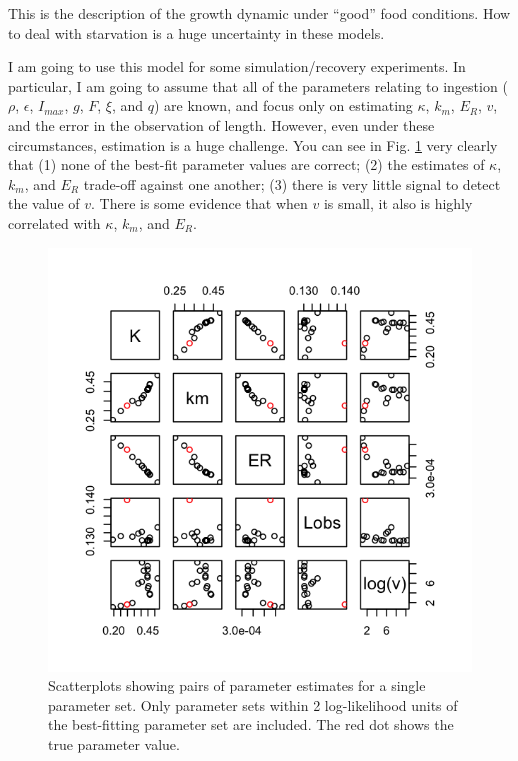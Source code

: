\documentclass[12pt,reqno,final,pdftex]{amsart}\usepackage[]{graphicx}\usepackage[]{color}
\newenvironment{knitrout}{}{} %
\theoremstyle{plain}
\numberwithin{equation}{part}
\begin{document}
This is the description of the growth dynamic under ``good'' food conditions.
How to deal with starvation is a huge uncertainty in these models.

I am going to use this model for some simulation/recovery experiments.
In particular, I am going to assume that all of the parameters relating to ingestion ($\rho$, $\epsilon$, $I_{max}$, $g$, $F$, $\xi$, and $q$) are known, and focus only on estimating $\kappa$, $k_m$, $E_R$, $v$, and the error in the observation of length.
However, even under these circumstances, estimation is a huge challenge.
You can see in Fig. \ref{fig:growth-reprod-1} very clearly that (1) none of the best-fit parameter values are correct; (2) the estimates of $\kappa$, $k_m$, and $E_R$ trade-off against one another; (3) there is very little signal to detect the value of $v$.
There is some evidence that when $v$ is small, it also is highly correlated with $\kappa$, $k_m$, and $E_R$.

\begin{knitrout}\scriptsize
{}\color{fgcolor}\begin{figure}

\includegraphics[width=\linewidth]{figure/growth-reprod-1-1} \hfill{}

\caption[Scatterplots showing pairs of parameter estimates for a single parameter set]{Scatterplots showing pairs of parameter estimates for a single parameter set. Only parameter sets within 2 log-likelihood units of the best-fitting parameter set are included. The red dot shows the true parameter value.}\label{fig:growth-reprod-1}
\end{figure}


\end{knitrout}
\end{document}
